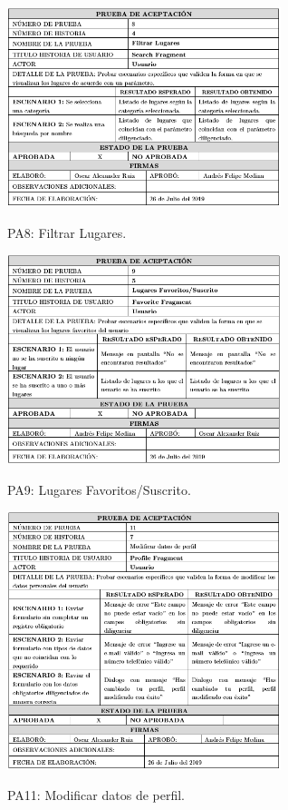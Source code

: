 \documentclass[12pt,letterpaper,openany]{book}
\begin{document}
\begin{table}[H]
\centering
\includegraphics[width=8cm]{./imagenes/PA/PA8}
\caption{PA8: Filtrar Lugares.}
\end{table}

\begin{table}[H]
\centering
\includegraphics[width=8cm]{./imagenes/PA/PA9}
\caption{PA9: Lugares Favoritos/Suscrito.}
\end{table}

\begin{table}[H]
\centering
\includegraphics[width=8cm]{./imagenes/PA/PA11}
\caption{PA11: Modificar datos de perfil.}
\end{table}
\end{document}
